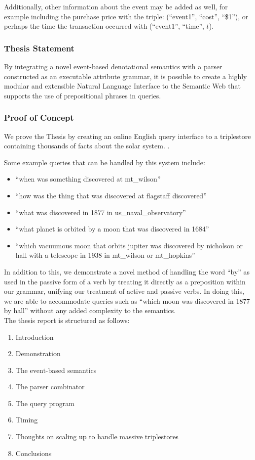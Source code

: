\documentclass[../main.tex]{subfiles}
\begin{document}
Additionally, other information about the event may be added as well, for example including the purchase price with the triple: (``event1'', ``cost'', ``\$1''), or perhaps the time the transaction occurred with (``event1'', ``time'', $t$).  

\subsubsection*{Thesis Statement}
By integrating a novel event-based denotational semantics with a parser constructed as an executable attribute grammar, it is possible to create a highly modular and extensible Natural Language Interface to the Semantic Web that supports the use of prepositional phrases in queries.

\subsubsection*{Proof of Concept} We prove the Thesis by creating an online English query interface to a triplestore containing thousands of facts about the solar system. \cite{Solarman:2016}.

Some example queries that can be handled by this system include:

\begin{itemize}
	\item ``when was something discovered at mt\_wilson''
	\item ``how was the thing that was discovered at flagstaff discovered''
	\item ``what was discovered in 1877 in us\_naval\_observatory''
	\item ``what planet is orbited by a moon that was discovered in 1684''
	\item ``which vacuumous moon that orbits jupiter was discovered by nicholson or hall with a telescope in 1938 in mt\_wilson or mt\_hopkins''
\end{itemize}

In addition to this, we demonstrate a novel method of handling the word ``by'' as used in the passive form of a verb by treating it directly as a preposition within our grammar, unifying our treatment of active and passive verbs.  In doing this, we are able to accommodate queries such as ``which moon was discovered in 1877 by hall'' without any added complexity to the semantics.\\

The thesis report is structured as follows:

\begin{enumerate}
	\item Introduction
	\item Demonstration
	\item The event-based semantics
	\item The parser combinator
	\item The query program
	\item Timing
	\item Thoughts on scaling up to handle massive triplestores
	\item Conclusions
\end{enumerate}
\end{document}
